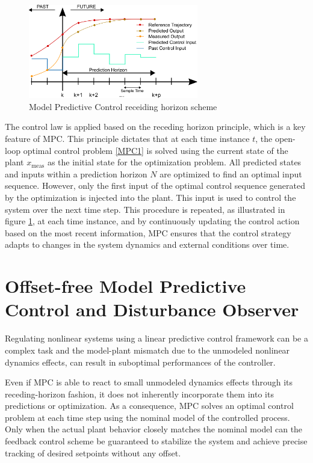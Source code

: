 \documentclass[a4paper,12pt,oneside]{book}
\begin{document}
\begin{figure}
	\centering
	\includegraphics[width=0.66\textwidth]{MPC.png}
	\caption{Model Predictive Control receiding horizon scheme}
	\label{image:mpc}
\end{figure}

\bigskip
The control law is applied based on the receding horizon principle, which is a key feature of MPC.
This principle dictates that at each time instance $t$, the open-loop optimal control problem \eqref{MPC1} is solved using the current state of the plant $x_{\text{meas}}$ as the initial state for the optimization problem.
All predicted states and inputs within a prediction horizon $N$ are optimized to find an optimal input sequence.
However, only the first input of the optimal control sequence generated by the optimization is injected into the plant. 
This input is used to control the system over the next time step.
This procedure is repeated, as illustrated in figure \ref{image:mpc}, at each time instance, and by continuously updating the control action based on the most recent information, MPC ensures that the control strategy adapts to changes in the system dynamics and external conditions over time.




\section{Offset-free Model Predictive Control and Disturbance Observer}
Regulating nonlinear systems using a linear predictive control framework can be a complex task and the model-plant mismatch due to the unmodeled nonlinear dynamics effects, can result in suboptimal performances of the controller.

\bigskip
Even if MPC is able to react to small unmodeled dynamics effects through its receding-horizon fashion, it does not inherently incorporate them into its predictions or optimization.
As a consequence, MPC solves an optimal control problem at each time step using the nominal model of the controlled process. 
Only when the actual plant behavior closely matches the nominal model can the feedback control scheme be guaranteed to stabilize the system and achieve precise tracking of desired setpoints without any offset.
\end{document}
